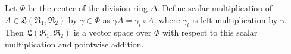 Let $\Phi$ be the center of the division ring $\Delta$. Define scalar multiplication of $A \in \mathfrak{L}(\mathfrak{R}_1, \mathfrak{R}_2)$ by $\gamma \in \Phi$ as $\gamma A = \gamma_l \circ A$, where $\gamma_l$ is left multiplication by $\gamma$. Then $\mathfrak{L}(\mathfrak{R}_1, \mathfrak{R}_2)$ is a vector space over $\Phi$ with respect to this scalar multiplication and pointwise addition.
